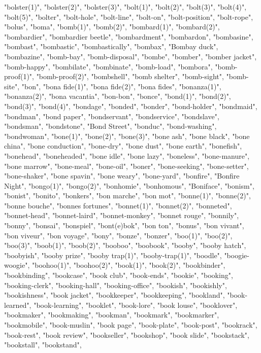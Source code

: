 "bolster(1)",
"bolster(2)",
"bolster(3)",
"bolt(1)",
"bolt(2)",
"bolt(3)",
"bolt(4)",
"bolt(5)",
"bolter",
"bolt-hole",
"bolt-line",
"bolt-on",
"bolt-position",
"bolt-rope",
"bolus",
"boma",
"bomb(1)",
"bomb(2)",
"bombard(1)",
"bombard(2)",
"bombardier",
"bombardier beetle",
"bombardment",
"bombardon",
"bombasine",
"bombast",
"bombastic",
"bombastically",
"bombax",
"Bombay duck",
"bombazine",
"bomb-bay",
"bomb-disposal",
"bombe",
"bomber",
"bomber jacket",
"bomb-happy",
"bombilate",
"bombinate",
"bomb-load",
"bombora",
"bomb-proof(1)",
"bomb-proof(2)",
"bombshell",
"bomb shelter",
"bomb-sight",
"bomb-site",
"bon",
"bona fide(1)",
"bona fide(2)",
"bona fides",
"bonanza(1)",
"bonanza(2)",
"bona vacantia",
"bon-bon",
"bonce",
"bond(1)",
"bond(2)",
"bond(3)",
"bond(4)",
"bondage",
"bonded",
"bonder",
"bond-holder",
"bondmaid",
"bondman",
"bond paper",
"bondservant",
"bondservice",
"bondslave",
"bondsman",
"bondstone",
"Bond Street",
"bonduc",
"bond-washing",
"bondwoman",
"bone(1)",
"bone(2)",
"bone(3)",
"bone ash",
"bone black",
"bone china",
"bone conduction",
"bone-dry",
"bone dust",
"bone earth",
"bonefish",
"bonehead",
"boneheaded",
"bone idle",
"bone lazy",
"boneless",
"bone-manure",
"bone marrow",
"bone-meal",
"bone-oil",
"boner",
"bone-seeking",
"bone-setter",
"bone-shaker",
"bone spavin",
"bone weary",
"bone-yard",
"bonfire",
"Bonfire Night",
"bongo(1)",
"bongo(2)",
"bonhomie",
"bonhomous",
"Boniface",
"bonism",
"bonist",
"bonito",
"bonkers",
"bon marche",
"bon mot",
"bonne(1)",
"bonne(2)",
"bonne bouche",
"bonnes fortunes",
"bonnet(1)",
"bonnet(2)",
"bonneted",
"bonnet-head",
"bonnet-laird",
"bonnet-monkey",
"bonnet rouge",
"bonnily",
"bonny",
"bonsai",
"bonspiel",
"bont(e)bok",
"bon ton",
"bonus",
"bon vivant",
"bon viveur",
"bon voyage",
"bony",
"bonze",
"bonzer",
"boo(1)",
"boo(2)",
"boo(3)",
"boob(1)",
"boob(2)",
"booboo",
"boobook",
"booby",
"booby hatch",
"boobyish",
"booby prize",
"booby trap(1)",
"booby-trap(1)",
"boodle",
"boogie-woogie",
"boohoo(1)",
"boohoo(2)",
"book(1)",
"book(2)",
"bookbinder",
"bookbinding",
"bookcase",
"book club",
"book-ends",
"bookie",
"booking",
"booking-clerk",
"booking-hall",
"booking-office",
"bookish",
"bookishly",
"bookishness",
"book jacket",
"bookkeeper",
"bookkeeping",
"bookland",
"book-learned",
"book-learning",
"booklet",
"book-lore",
"book louse",
"booklover",
"bookmaker",
"bookmaking",
"bookman",
"bookmark",
"bookmarker",
"bookmobile",
"book-muslin",
"book page",
"book-plate",
"book-post",
"bookrack",
"book-rest",
"book review",
"bookseller",
"bookshop",
"book slide",
"bookstack",
"bookstall",
"bookstand",
